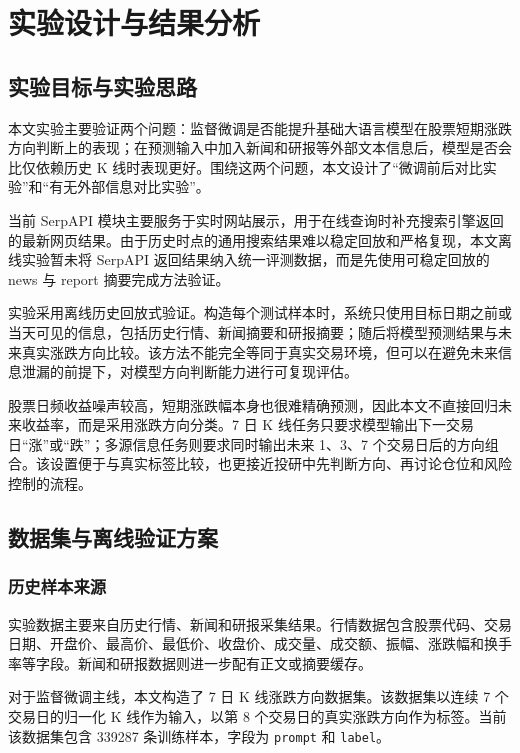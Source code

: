 
\chapter{实验设计与结果分析}

\section{实验目标与实验思路}

本文实验主要验证两个问题：监督微调是否能提升基础大语言模型在股票短期涨跌方向判断上的表现；在预测输入中加入新闻和研报等外部文本信息后，模型是否会比仅依赖历史 K 线时表现更好。围绕这两个问题，本文设计了“微调前后对比实验”和“有无外部信息对比实验”。

当前 SerpAPI 模块主要服务于实时网站展示，用于在线查询时补充搜索引擎返回的最新网页结果。由于历史时点的通用搜索结果难以稳定回放和严格复现，本文离线实验暂未将 SerpAPI 返回结果纳入统一评测数据，而是先使用可稳定回放的 news 与 report 摘要完成方法验证。

实验采用离线历史回放式验证。构造每个测试样本时，系统只使用目标日期之前或当天可见的信息，包括历史行情、新闻摘要和研报摘要；随后将模型预测结果与未来真实涨跌方向比较。该方法不能完全等同于真实交易环境，但可以在避免未来信息泄漏的前提下，对模型方向判断能力进行可复现评估。

股票日频收益噪声较高，短期涨跌幅本身也很难精确预测，因此本文不直接回归未来收益率，而是采用涨跌方向分类。7 日 K 线任务只要求模型输出下一交易日“涨”或“跌”；多源信息任务则要求同时输出未来 1、3、7 个交易日后的方向组合。该设置便于与真实标签比较，也更接近投研中先判断方向、再讨论仓位和风险控制的流程。

\section{数据集与离线验证方案}

\subsection{历史样本来源}

实验数据主要来自历史行情、新闻和研报采集结果。行情数据包含股票代码、交易日期、开盘价、最高价、最低价、收盘价、成交量、成交额、振幅、涨跌幅和换手率等字段。新闻和研报数据则进一步配有正文或摘要缓存。

对于监督微调主线，本文构造了 7 日 K 线涨跌方向数据集。该数据集以连续 7 个交易日的归一化 K 线作为输入，以第 8 个交易日的真实涨跌方向作为标签。当前该数据集包含 339287 条训练样本，字段为 \texttt{prompt} 和 \texttt{label}。

